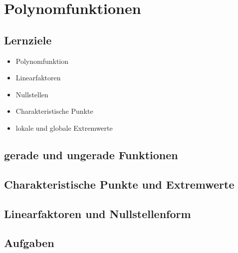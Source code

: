 
\section{Polynomfunktionen}

\subsection*{Lernziele}

\begin{itemize}
\item Polynomfunktion
\item Linearfaktoren
\item Nullstellen
\item Charakteristische Punkte
\item lokale und globale Extremwerte
\end{itemize}


\subsection{gerade und ungerade Funktionen}


\subsection{Charakteristische Punkte und Extremwerte}

\subsection{Linearfaktoren und Nullstellenform}


\subsection*{Aufgaben}



\newpage

